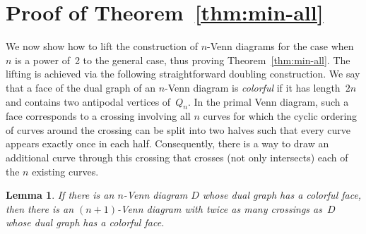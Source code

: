 \documentclass[11pt]{article}
\newtheorem{lemma}[theorem]{Lemma}
\newcommand{\defi}[1]{\textcolor{defblue}{\emph{#1}}}
\begin{document}
\section{Proof of Theorem~\ref{thm:min-all}}
%
We now show how to lift the construction of $n$-Venn diagrams for the case when $n$ is a power of~2 to the general case, thus proving Theorem~\ref{thm:min-all}.
The lifting is achieved via the following straightforward doubling construction.
%
We say that a face of the dual graph of an $n$-Venn diagram is \defi{colorful} if it has length~$2n$ and contains two antipodal vertices of~$Q_n$.
In the primal Venn diagram, such a face corresponds to a crossing involving all $n$ curves for which the cyclic ordering of curves around the crossing can be split into two halves such that every curve appears exactly once in each half.
Consequently, there is a way to draw an additional curve through this crossing that crosses (not only intersects) each of the $n$ existing curves.
%
\begin{lemma}
\label{lem:doubling}
If there is an $n$-Venn diagram $D$ whose dual graph has a colorful face, then there is an $(n+1)$-Venn diagram with twice as many crossings as~$D$ whose dual graph has a colorful face.
\end{lemma}
%
\end{document}
